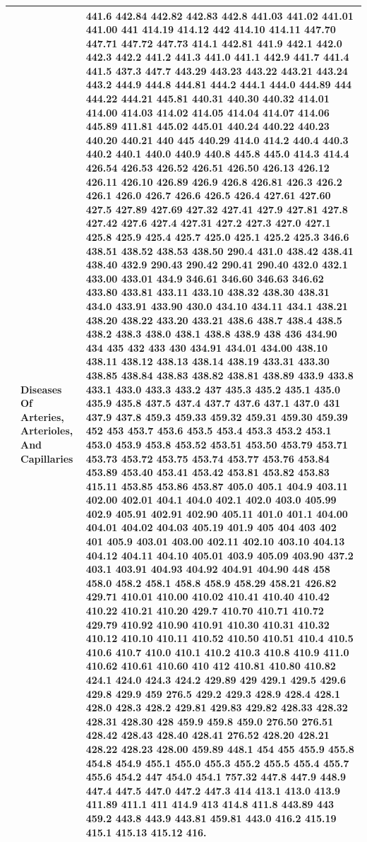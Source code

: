 \documentclass[3p,super,numbers,sort&compress,preprint,10pt]{elsarticle}
\begin{document}
\begin{longtable}{|L{.1in}|L{.6in}||L{5.65in}|}
   & Diseases Of Arteries, Arterioles, And Capillaries  &  441.6 442.84 442.82 442.83 442.8 441.03 441.02 441.01 441.00 441 414.19 414.12 442 414.10 414.11 447.70 447.71 447.72 447.73 414.1 442.81 441.9 442.1 442.0 442.3 442.2 441.2 441.3 441.0 441.1 442.9 441.7 441.4 441.5 437.3 447.7 443.29 443.23 443.22 443.21 443.24 443.2 444.9 444.8 444.81 444.2 444.1 444.0 444.89 444 444.22 444.21 445.81 440.31 440.30 440.32 414.01 414.00 414.03 414.02 414.05 414.04 414.07 414.06 445.89 411.81 445.02 445.01 440.24 440.22 440.23 440.20 440.21 440 445 440.29 414.0 414.2 440.4 440.3 440.2 440.1 440.0 440.9 440.8 445.8 445.0 414.3 414.4 426.54 426.53 426.52 426.51 426.50 426.13 426.12 426.11 426.10 426.89 426.9 426.8 426.81 426.3 426.2 426.1 426.0 426.7 426.6 426.5 426.4 427.61 427.60 427.5 427.89 427.69 427.32 427.41 427.9 427.81 427.8 427.42 427.6 427.4 427.31 427.2 427.3 427.0 427.1 425.8 425.9 425.4 425.7 425.0 425.1 425.2 425.3 346.6 438.51 438.52 438.53 438.50 290.4 431.0 438.42 438.41 438.40 432.9 290.43 290.42 290.41 290.40 432.0 432.1 433.00 433.01 434.9 346.61 346.60 346.63 346.62 433.80 433.81 433.11 433.10 438.32 438.30 438.31 434.0 433.91 433.90 430.0 434.10 434.11 434.1 438.21 438.20 438.22 433.20 433.21 438.6 438.7 438.4 438.5 438.2 438.3 438.0 438.1 438.8 438.9 438 436 434.90 434 435 432 433 430 434.91 434.01 434.00 438.10 438.11 438.12 438.13 438.14 438.19 433.31 433.30 438.85 438.84 438.83 438.82 438.81 438.89 433.9 433.8 433.1 433.0 433.3 433.2 437 435.3 435.2 435.1 435.0 435.9 435.8 437.5 437.4 437.7 437.6 437.1 437.0 431 437.9 437.8 459.3 459.33 459.32 459.31 459.30 459.39 452 453 453.7 453.6 453.5 453.4 453.3 453.2 453.1 453.0 453.9 453.8 453.52 453.51 453.50 453.79 453.71 453.73 453.72 453.75 453.74 453.77 453.76 453.84 453.89 453.40 453.41 453.42 453.81 453.82 453.83 415.11 453.85 453.86 453.87 405.0 405.1 404.9 403.11 402.00 402.01 404.1 404.0 402.1 402.0 403.0 405.99 402.9 405.91 402.91 402.90 405.11 401.0 401.1 404.00 404.01 404.02 404.03 405.19 401.9 405 404 403 402 401 405.9 403.01 403.00 402.11 402.10 403.10 404.13 404.12 404.11 404.10 405.01 403.9 405.09 403.90 437.2 403.1 403.91 404.93 404.92 404.91 404.90 448 458 458.0 458.2 458.1 458.8 458.9 458.29 458.21 426.82 429.71 410.01 410.00 410.02 410.41 410.40 410.42 410.22 410.21 410.20 429.7 410.70 410.71 410.72 429.79 410.92 410.90 410.91 410.30 410.31 410.32 410.12 410.10 410.11 410.52 410.50 410.51 410.4 410.5 410.6 410.7 410.0 410.1 410.2 410.3 410.8 410.9 411.0 410.62 410.61 410.60 410 412 410.81 410.80 410.82 424.1 424.0 424.3 424.2 429.89 429 429.1 429.5 429.6 429.8 429.9 459 276.5 429.2 429.3 428.9 428.4 428.1 428.0 428.3 428.2 429.81 429.83 429.82 428.33 428.32 428.31 428.30 428 459.9 459.8 459.0 276.50 276.51 428.42 428.43 428.40 428.41 276.52 428.20 428.21 428.22 428.23 428.00 459.89 448.1 454 455 455.9 455.8 454.8 454.9 455.1 455.0 455.3 455.2 455.5 455.4 455.7 455.6 454.2 447 454.0 454.1 757.32 447.8 447.9 448.9 447.4 447.5 447.0 447.2 447.3 414 413.1 413.0 413.9 411.89 411.1 411 414.9 413 414.8 411.8 443.89 443 459.2 443.8 443.9 443.81 459.81 443.0 416.2 415.19 415.1 415.13 415.12 416.\\\hline

\end{longtable}
\end{document}
